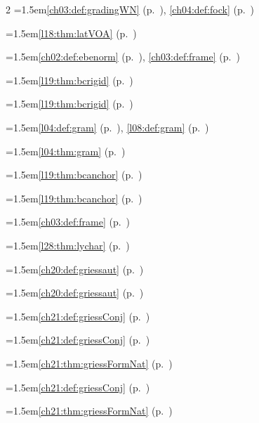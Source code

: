 \begin{multicols}{2}
\hangindent=1.5em\quad \ref{ch03:def:gradingWN} (p.~\pageref{ch03:def:gradingWN}), \ref{ch04:def:fock} (p.~\pageref{ch04:def:fock})\par
\hangindent=1.5em\quad \ref{l18:thm:latVOA} (p.~\pageref{l18:thm:latVOA})\par
\hangindent=1.5em\quad \ref{ch02:def:ebenorm} (p.~\pageref{ch02:def:ebenorm}), \ref{ch03:def:frame} (p.~\pageref{ch03:def:frame})\par
\hangindent=1.5em\quad \ref{l19:thm:bcrigid} (p.~\pageref{l19:thm:bcrigid})\par
\hangindent=1.5em\quad \ref{l19:thm:bcrigid} (p.~\pageref{l19:thm:bcrigid})\par
\hangindent=1.5em\quad \ref{l04:def:gram} (p.~\pageref{l04:def:gram}), \ref{l08:def:gram} (p.~\pageref{l08:def:gram})\par
\hangindent=1.5em\quad \ref{l04:thm:gram} (p.~\pageref{l04:thm:gram})\par
\hangindent=1.5em\quad \ref{l19:thm:bcanchor} (p.~\pageref{l19:thm:bcanchor})\par
\hangindent=1.5em\quad \ref{l19:thm:bcanchor} (p.~\pageref{l19:thm:bcanchor})\par
\hangindent=1.5em\quad \ref{ch03:def:frame} (p.~\pageref{ch03:def:frame})\par
\hangindent=1.5em\quad \ref{l28:thm:lychar} (p.~\pageref{l28:thm:lychar})\par
\hangindent=1.5em\quad \ref{ch20:def:griessaut} (p.~\pageref{ch20:def:griessaut})\par
\hangindent=1.5em\quad \ref{ch20:def:griessaut} (p.~\pageref{ch20:def:griessaut})\par
\hangindent=1.5em\quad \ref{ch21:def:griessConj} (p.~\pageref{ch21:def:griessConj})\par
\hangindent=1.5em\quad \ref{ch21:def:griessConj} (p.~\pageref{ch21:def:griessConj})\par
\hangindent=1.5em\quad \ref{ch21:thm:griessFormNat} (p.~\pageref{ch21:thm:griessFormNat})\par
\hangindent=1.5em\quad \ref{ch21:def:griessConj} (p.~\pageref{ch21:def:griessConj})\par
\hangindent=1.5em\quad \ref{ch21:thm:griessFormNat} (p.~\pageref{ch21:thm:griessFormNat})\par

\end{multicols}
